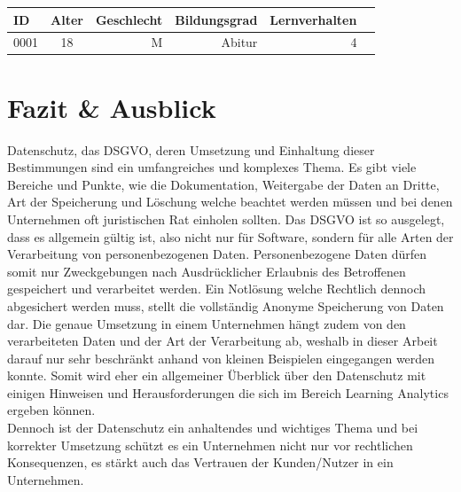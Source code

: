 \documentclass[a4paper, 12pt]{article}
\begin{document}
\begin{tabular}{lcrrrr}
	
	ID & Alter & Geschlecht & Bildungsgrad & Lernverhalten\\
	\hline
	0001 & 18 & M & Abitur & 4
	
\end{tabular}

\newpage
\section{Fazit \& Ausblick}
Datenschutz, das DSGVO, deren Umsetzung und Einhaltung dieser Bestimmungen sind ein umfangreiches und komplexes Thema. Es gibt viele Bereiche und Punkte, wie die Dokumentation, Weitergabe der Daten an Dritte, Art der Speicherung und Löschung welche beachtet werden müssen und bei denen Unternehmen oft juristischen Rat einholen sollten. Das DSGVO ist so ausgelegt, dass es allgemein gültig ist, also nicht nur für Software, sondern für alle Arten der Verarbeitung von personenbezogenen Daten. Personenbezogene Daten dürfen somit nur Zweckgebungen nach Ausdrücklicher Erlaubnis des Betroffenen gespeichert und verarbeitet werden. Ein Notlösung welche Rechtlich dennoch abgesichert werden muss, stellt die vollständig Anonyme Speicherung von Daten dar. Die genaue Umsetzung in einem Unternehmen hängt zudem von den verarbeiteten Daten und der Art der Verarbeitung ab, weshalb in dieser Arbeit darauf nur sehr beschränkt anhand von kleinen Beispielen eingegangen werden konnte. Somit wird eher ein allgemeiner Überblick über den Datenschutz mit einigen Hinweisen und Herausforderungen die sich im Bereich Learning Analytics ergeben können.\\Dennoch ist der Datenschutz ein anhaltendes und wichtiges Thema und bei korrekter Umsetzung schützt es ein Unternehmen nicht nur vor rechtlichen Konsequenzen, es stärkt auch das Vertrauen der Kunden/Nutzer in ein Unternehmen.
\newpage
\listoffigures

\newpage

\end{document}
